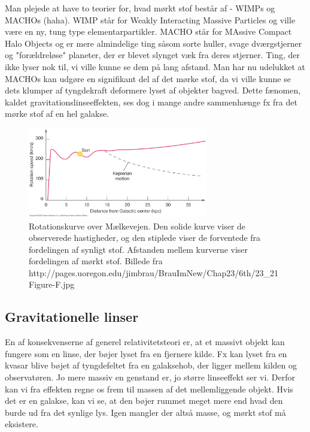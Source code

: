 Man plejede at have to teorier for, hvad mørkt stof består af - WIMPs og MACHOs (haha). WIMP står for Weakly Interacting Massive Particles og ville være en ny, tung type elementarpartikler. MACHO står for MAssive Compact Halo Objects og er mere almindelige ting såsom sorte huller, svage dværgstjerner og "forældreløse" planeter, der er blevet slynget væk fra deres stjerner. Ting, der ikke lyser nok til, vi ville kunne se dem på lang afstand. Man har nu udelukket at MACHOs kan udgøre en signifikant del af det mørke stof, da vi ville kunne se dets klumper af tyngdekraft deformere lyset af objekter bagved. Dette fænomen, kaldet gravitationslinseeffekten, ses dog i mange andre sammenhænge fx fra det mørke stof af en hel galakse. 

\begin{figure}[h!]
	\centering
	\includegraphics[width=0.7\textwidth]{Astrofysik/Astrofig/rotationskurve.jpg}
	\caption{Rotationskurve over Mælkevejen. Den solide kurve viser de observerede hastigheder, og den stiplede viser de forventede fra fordelingen af synligt stof. Afstanden mellem kurverne viser fordelingen af mørkt stof. Billede fra http://pages.uoregon.edu/jimbrau/BrauImNew/Chap23/6th/23\_21Figure-F.jpg
		}
	\label{rotationskurve}
\end{figure}

\subsection{Gravitationelle linser}

En af konsekvenserne af generel relativitetsteori er, at et massivt objekt kan fungere som en linse, der bøjer lyset fra en fjernere kilde. Fx kan lyset fra en kvasar blive bøjet af tyngdefeltet fra en galaksehob, der ligger mellem kilden og observatøren. Jo mere massiv en genstand er, jo større linseeffekt ser vi. Derfor kan vi fra effekten regne os frem til massen af det mellemliggende objekt. Hvis det er en galakse, kan vi se, at den bøjer rummet meget mere end hvad den burde ud fra det synlige lys. Igen mangler der altså masse, og mørkt stof må eksistere.


